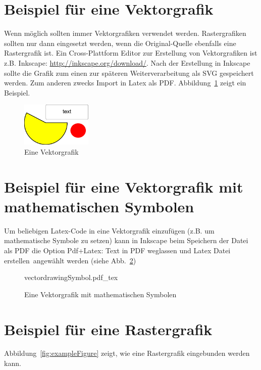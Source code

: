\section{Beispiel für eine Vektorgrafik}

Wenn möglich sollten immer Vektorgrafiken verwendet werden. Rastergrafiken sollten nur dann eingesetzt werden, wenn die Original-Quelle ebenfalls eine Rastergrafik ist. Ein 
Cross-Plattform Editor zur Erstellung von Vektorgrafiken ist z.B. Inkscape:
\url{http://inkscape.org/download/}. Nach der Erstellung in Inkscape sollte die Grafik zum einen zur späteren Weiterverarbeitung als SVG gespeichert werden. Zum anderen zwecks Import in Latex als PDF. Abbildung~\ref{fig:vectorExample} zeigt ein Beispiel.


\begin{figure}[htpb]
	\centering
		\includegraphics[width=0.30\textwidth]{fig/vectordrawing.pdf}
	\caption{Eine Vektorgrafik}
	\label{fig:vectorExample}
\end{figure}


\section{Beispiel für eine Vektorgrafik mit mathematischen Symbolen}

Um beliebigen Latex-Code in eine Vektorgrafik einzufügen (z.B. um mathematische Symbole zu setzen) kann in Inkscape beim Speichern der Datei als PDF die Option \glqq Pdf+Latex: Text in PDF weglassen und Latex Datei erstellen\grqq  ~angewählt werden (siehe Abb.~\ref{fig:vectorExampleSymbol})

\begin{figure}[htpb]
    \centering
    \def\svgwidth{0.30\textwidth}
  	{vectordrawingSymbol.pdf_tex}
	\caption{Eine Vektorgrafik mit mathematischen Symbolen}
	\label{fig:vectorExampleSymbol}
\end{figure}

\section{Beispiel für eine Rastergrafik}

Abbildung~\ref{fig:exampleFigure} zeigt, wie eine Rastergrafik eingebunden werden kann. \\

